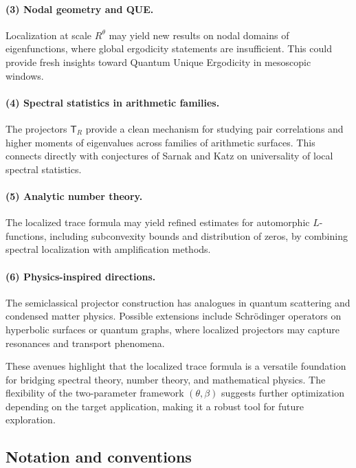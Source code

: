 \paragraph{(3) Nodal geometry and QUE.}
Localization at scale $R^\theta$ may yield new results on nodal domains of eigenfunctions,
where global ergodicity statements are insufficient. This could provide fresh insights
toward Quantum Unique Ergodicity in mesoscopic windows.

\paragraph{(4) Spectral statistics in arithmetic families.}
The projectors $\mathsf{T}_R$ provide a clean mechanism for studying pair correlations
and higher moments of eigenvalues across families of arithmetic surfaces. This connects
directly with conjectures of Sarnak and Katz on universality of local spectral statistics.

\paragraph{(5) Analytic number theory.}
The localized trace formula may yield refined estimates for automorphic $L$-functions,
including subconvexity bounds and distribution of zeros, by combining spectral localization
with amplification methods.

\paragraph{(6) Physics-inspired directions.}
The semiclassical projector construction has analogues in quantum scattering and condensed
matter physics. Possible extensions include Schrödinger operators on hyperbolic surfaces
or quantum graphs, where localized projectors may capture resonances and transport
phenomena.

\medskip
These avenues highlight that the localized trace formula is a versatile foundation for
bridging spectral theory, number theory, and mathematical physics. The flexibility of the
two-parameter framework $(\theta,\beta)$ suggests further optimization depending on the
target application, making it a robust tool for future exploration.

\subsection{Notation and conventions}\label{subsec:notation}


